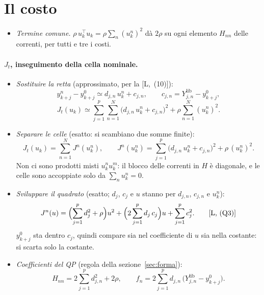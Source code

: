 \documentclass[11pt,a4paper]{article}
\newcommand{\lib}{\mathrm{lib}}
\begin{document}
\section{Il costo}\label{sec:costo}

\begin{itemize}
  \item \emph{Termine comune.} $\rho\, u_k^\top u_k = \rho \sum_n (u^n_k)^2$
        dà $2\rho$ su ogni elemento $H_{nn}$ delle correnti, per tutti e tre i
        costi.
\end{itemize}

\paragraph{$J_t$, inseguimento della cella nominale.}
\begin{itemize}
  \item \emph{Sostituire la retta} (approssimato, per la [L,~(10)]):
        \[
          y^n_{k+j} - y^0_{k+j} \simeq d_{j,n}\,u^n_k + c_{j,n} , \qquad
          c_{j,n} = Y^\lib_{j,n} - y^0_{k+j} ,
        \]
        \[
          J_t(u_k) \simeq \sum_{j=1}^{p}\sum_{n=1}^{N}
                     \bigl(d_{j,n}\,u^n_k + c_{j,n}\bigr)^2
                     + \rho \sum_{n=1}^{N} (u^n_k)^2 .
          \tag*{[L,~(Q1)]}
        \]
  \item \emph{Separare le celle} (esatto: si scambiano due somme finite):
        \[
          J_t(u_k) = \sum_{n=1}^{N} J^n(u^n_k) , \qquad
          J^n(u^n_k) = \sum_{j=1}^{p} \bigl(d_{j,n}\,u^n_k + c_{j,n}\bigr)^2
                       + \rho\,(u^n_k)^2 .
          \tag*{[L,~(Q2)]}
        \]
        Non ci sono prodotti misti $u^n_k u^m_k$: il blocco delle correnti in
        $H$ è diagonale, e le celle sono accoppiate solo da
        $\sum_n u^n_k = 0$.
  \item \emph{Sviluppare il quadrato} (esatto; $d_j$, $c_j$ e $u$ stanno per
        $d_{j,n}$, $c_{j,n}$ e $u^n_k$):
        \[
          J^n(u) = \Bigl(\sum_{j=1}^{p} d_j^2 + \rho\Bigr) u^2
                 + \Bigl(2\sum_{j=1}^{p} d_j\,c_j\Bigr) u
                 + \sum_{j=1}^{p} c_j^2 .
          \tag*{[L,~(Q3)]}
        \]
        $y^0_{k+j}$ sta dentro $c_j$, quindi compare sia nel coefficiente di
        $u$ sia nella costante: si scarta solo la costante.
  \item \emph{Coefficienti del QP} (regola della sezione~\ref{sec:forma}):
        \[
          H_{nn} = 2\sum_{j=1}^{p} d_{j,n}^2 + 2\rho , \qquad
          f_n = 2\sum_{j=1}^{p} d_{j,n}\,\bigl(Y^\lib_{j,n} - y^0_{k+j}\bigr) .
          \tag*{[L,~(11)]}
        \]
\end{itemize}
\end{document}

